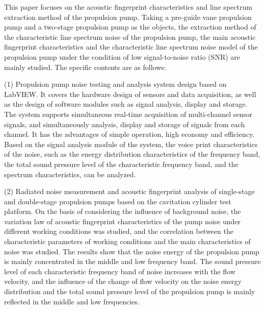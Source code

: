 This paper focuses on the acoustic fingerprint characteristics and line spectrum extraction method of the propulsion pump. Taking a pre-guide vane propulsion pump and a two-stage propulsion pump as the objects, the extraction method of the characteristic line spectrum noise of the propulsion pump, the main acoustic fingerprint characteristics and the characteristic line spectrum noise model of the propulsion pump under the condition of low signal-to-noise ratio (SNR) are mainly studied. The specific contents are as follows:

(1) Propulsion pump noise testing and analysis system design based on LabVIEW. It covers the hardware design of sensors and data acquisition, as well as the design of software modules such as signal analysis, display and storage. The system supports simultaneous real-time acquisition of multi-channel sensor signals, and simultaneously analysis, display and storage of signals from each channel. It has the advantages of simple operation, high economy and efficiency. Based on the signal analysis module of the system, the voice print characteristics of the noise, such as the energy distribution characteristics of the frequency band, the total sound pressure level of the characteristic frequency band, and the spectrum characteristics, can be analyzed.

(2) Radiated noise measurement and acoustic fingerprint analysis of single-stage and double-stage propulsion pumps based on the cavitation cylinder test platform. On the basis of considering the influence of background noise, the variation law of acoustic fingerprint characteristics of the pump noise under different working conditions was studied, and the correlation between the characteristic parameters of working conditions and the main characteristics of noise was studied. The results show that the noise energy of the propulsion pump is mainly concentrated in the middle and low frequency band. The sound pressure level of each characteristic frequency band of noise increases with the flow velocity, and the influence of the change of flow velocity on the noise energy distribution and the total sound pressure level of the propulsion pump is mainly reflected in the middle and low frequencies.

